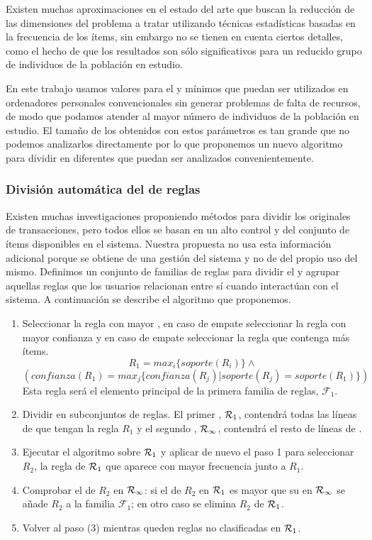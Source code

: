 Existen muchas aproximaciones en el estado del arte que buscan la reducción de las dimensiones del problema a tratar utilizando técnicas estadísticas basadas en la frecuencia de los ítems, sin embargo no se tienen en cuenta ciertos detalles, como el hecho de que los resultados son sólo significativos para un reducido grupo de individuos de la población en estudio.

En este trabajo usamos valores para el \soporte y \confianza mínimos que puedan ser utilizados en ordenadores personales convencionales sin generar problemas de falta de recursos, de modo que podamos atender al mayor número de individuos de la población en estudio. El tamaño de los \datasets \R obtenidos con estos parámetros es tan grande que no podemos analizarlos directamente por lo que proponemos un nuevo algoritmo para dividir \R en diferentes \datasets que puedan ser analizados convenientemente.



\subsubsection{División automática del \dataset de reglas}
Existen muchas investigaciones proponiendo métodos para dividir los \datasets originales de transacciones, pero todos ellos se basan en un alto control y \clasificacion del conjunto de ítems disponibles en el sistema. Nuestra propuesta no usa esta información adicional porque se obtiene de una gestión del sistema y no de del propio uso del mismo. Definimos un conjunto de familias de reglas para dividir el \dataset \R y agrupar aquellas reglas que los usuarios relacionan entre sí cuando interactúan con el sistema. A continuación se describe el algoritmo que proponemos.

\begin{enumerate}
  \item Seleccionar la regla con mayor \soporte, en caso de empate seleccionar la regla con mayor confianza y en caso de empate seleccionar la regla que contenga más ítems.
  $$R_1 = max_i\{soporte(R_i)\} \wedge$$
  $$\left(confianza(R_1) = max_j\{confianza(R_j) | soporte(R_j) = soporte(R_1)\} \right)$$
  Esta regla será el elemento principal de la primera familia de reglas, $\mathcal{F}_1$.
  \item Dividir \R en subconjuntos de reglas. El primer \dataset, $\R_1$, contendrá todas las líneas de \R que tengan la regla $R_1$ y el segundo \dataset, $\R_\infty$, contendrá el resto de líneas de \R.
  \item Ejecutar el algoritmo \apriori sobre $\R_1$ y aplicar de nuevo el paso 1 para seleccionar $R_2$, la regla de $\R_1$ que aparece con mayor frecuencia junto a $R_1$.
  \item Comprobar el \soporte de $R_2$ en $\R_\infty$: si el \soporte de $R_2$ en $\R_1$ es mayor que su \soporte en $\R_\infty$ se añade $R_2$ a la familia $\mathcal{F}_1$; en otro caso se elimina $R_2$ de $\R_1$.
  \item Volver al paso (3) mientras queden reglas no clasificadas en $\R_1$.
\end{enumerate}

